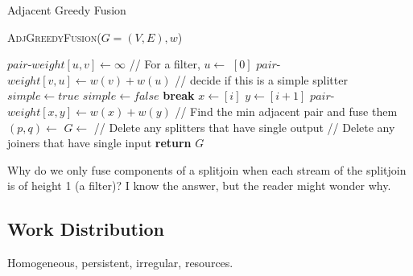 \begin{algorithm}
\caption{Adjacent Greedy Fusion} \label {alg:adj_fus}
\textsc{AdjGreedyFusion}($G = (V, E), w$)
\begin{algorithmic}[1]
		\State $pair$-$weight[u,v] \gets \infty$
	\EndFor
\EndFor
{}
\Statex // For a filter, 
		\State $u \gets $ $[0]$
		\State $pair$-$weight[v,u] \gets w(v) + w(u)$
		\Statex // decide if this is a simple splitter
		\State $simple \gets true$			
				\State $simple \gets false$
				\State \textbf{break}
			\EndIf
		\EndFor
				\State $x \gets $$[i]$
				\State $y \gets $$[i + 1]$
				\State $pair$-$weight[x,y] \gets w(x) + w(y)$
			\EndFor 
		\EndIf
	\EndIf
\EndFor
\Statex // Find the min adjacent pair and fuse them
\State $(p, q) \gets $ 
\State $G \gets $ 
\Statex // Delete any splitters that have single output
\State {}
\Statex // Delete any joiners that have single input
\State {}
\State \textbf{return} $G$
\end{algorithmic}
\end{algorithm}

Why do we only fuse components of a splitjoin when each stream of the
splitjoin is of height 1 (a filter)?  I know the answer, but the
reader might wonder why.
 

\subsection{Work Distribution}
Homogeneous, persistent, irregular, resources.

